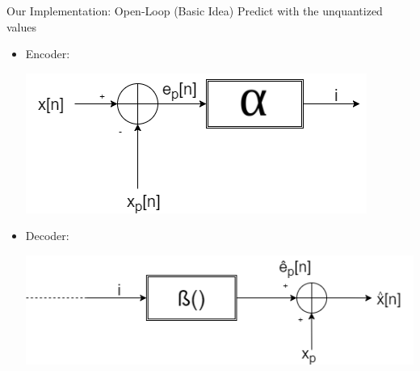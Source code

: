 \documentclass[10pt]{beamer}
\begin{document}
  \begin{frame}{Our Implementation: Open-Loop (Basic Idea)}
  Predict with the unquantized values
    \begin{itemize}
      \item Encoder:\\
        \begin{center}
        \includegraphics[width=0.6\linewidth]{./img/Esquema_1.png}
        \end{center}
      \item Decoder:\\
      \begin{center}
        \includegraphics[width=0.7\linewidth]{./img/Esquema_2.png}
      \end{center}
    \end{itemize}
  \end{frame}
\end{document}
